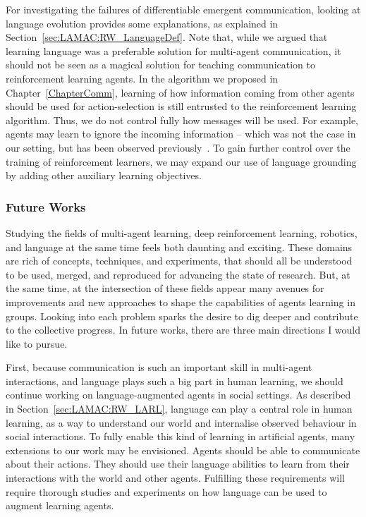 For investigating the failures of differentiable emergent communication, looking at language evolution provides some explanations, as explained in Section~\ref{sec:LAMAC:RW_LanguageDef}. Note that, while we argued that learning language was a preferable solution for multi-agent communication, it should not be seen as a magical solution for teaching communication to reinforcement learning agents. In the algorithm we proposed in Chapter~\ref{ChapterComm}, learning of how information coming from other agents should be used for action-selection is still entrusted to the reinforcement learning algorithm. Thus, we do not control fully how messages will be used. For example, agents may learn to ignore the incoming information -- which was not the case in our setting, but has been observed previously~\citep{Jaques2019_SocialInfluence}. To gain further control over the training of reinforcement learners, we may expand our use of language grounding by adding other auxiliary learning objectives. 


\subsubsection{Future Works}

Studying the fields of multi-agent learning, deep reinforcement learning, robotics, and language at the same time feels both daunting and exciting. These domains are rich of concepts, techniques, and experiments, that should all be understood to be used, merged, and reproduced for advancing the state of research. But, at the same time, at the intersection of these fields appear many avenues for improvements and new approaches to shape the capabilities of agents learning in groups. Looking into each problem sparks the desire to dig deeper and contribute to the collective progress. In future works, there are three main directions I would like to pursue. 

First, because communication is such an important skill in multi-agent interactions, and language plays such a big part in human learning, we should continue working on language-augmented agents in social settings. As described in Section~\ref{sec:LAMAC:RW_LARL}, language can play a central role in human learning, as a way to understand our world and internalise observed behaviour in social interactions. To fully enable this kind of learning in artificial agents, many extensions to our work may be envisioned. Agents should be able to communicate about their actions. They should use their language abilities to learn from their interactions with the world and other agents. Fulfilling these requirements will require thorough studies and experiments on how language can be used to augment learning agents. 



